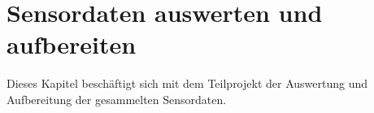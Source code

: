 
\chapter{Sensordaten auswerten und aufbereiten}
Dieses Kapitel beschäftigt sich mit dem Teilprojekt der Auswertung und Aufbereitung der gesammelten Sensordaten.


